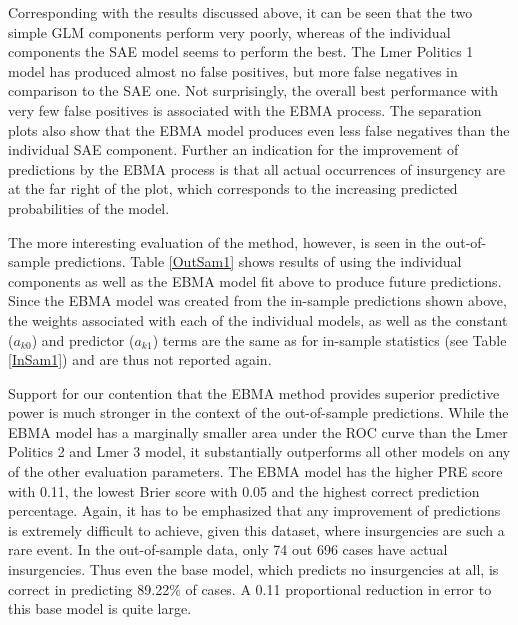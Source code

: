 \documentclass[pdftex,12pt,fullpage,oneside]{amsart}
\begin{document}
Corresponding with the results discussed above, it can be seen that
the two simple GLM components perform very poorly, whereas of the
individual components the SAE model seems to perform the best.  The Lmer
Politics 1 model has produced almost no false positives, but more
false negatives in comparison to the SAE one. Not surprisingly, the
overall best performance with very few false positives is associated
with the EBMA process. The separation plots also show that the EBMA model
produces even less false negatives than the individual SAE
component. Further an indication for the improvement of predictions by the
EBMA process is that all actual occurrences of insurgency are at the
far right of the plot, which corresponds to the increasing predicted
probabilities of the model.

The more interesting evaluation of the method, however, is seen in the
out-of-sample predictions. Table \ref{OutSam1} shows results of using
the individual components as well as the EBMA model fit above to
produce future predictions. Since the EBMA model was created
from the in-sample predictions shown above, the weights associated
with each of the individual models, as well as the constant ($a_{k0}$)
and predictor ($a_{k1}$) terms are the same as for in-sample
statistics (see Table \ref{InSam1}) and are thus not reported again.

Support for our contention that the EBMA method provides superior
predictive power is much stronger in the context of the out-of-sample
predictions.  While the EBMA model has a marginally smaller area under
the ROC curve than the Lmer Politics 2 and Lmer 3 model, it substantially
outperforms all other models on any of the other evaluation
parameters. The EBMA model has the higher PRE score with 0.11, the
lowest Brier score with 0.05 and the highest correct prediction
percentage. Again, it has to be emphasized that any improvement of
predictions is extremely difficult to achieve, given this dataset,
where insurgencies are such a rare event.  In the out-of-sample
data, only 74 out 696 cases have actual insurgencies. Thus even the
base model, which predicts no insurgencies at all, is correct in
predicting 89.22\% of cases. A 0.11 proportional
reduction in error to this base model is quite large.
\end{document}
